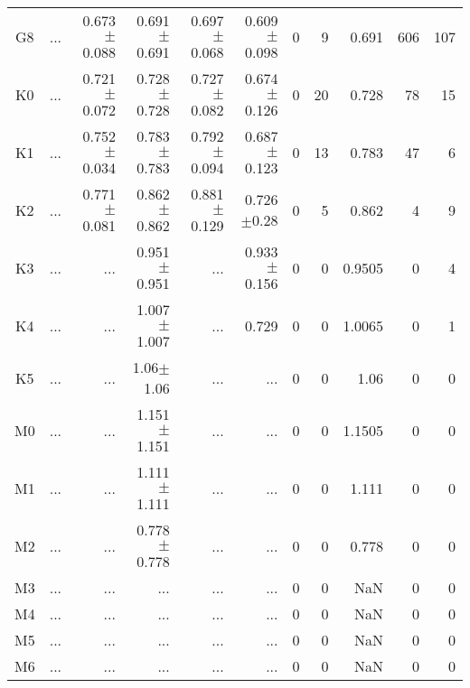 \begin{table}[t]
\begin{center}
\begin{tabular}{c|rrrrr|rrrrr}
G8	&	 ...	&	0.673$\pm$0.088	&	0.691$\pm$0.691	&	0.697$\pm$0.068	&	0.609$\pm$0.098	&	0	&	9	&	0.691	&	606	&	107	\\
K0	&	 ...	&	0.721$\pm$0.072	&	0.728$\pm$0.728	&	0.727$\pm$0.082	&	0.674$\pm$0.126	&	0	&	20	&	0.728	&	78	&	15	\\
K1	&	 ...	&	0.752$\pm$0.034	&	0.783$\pm$0.783	&	0.792$\pm$0.094	&	0.687$\pm$0.123	&	0	&	13	&	0.783	&	47	&	6	\\
K2	&	 ...	&	0.771$\pm$0.081	&	0.862$\pm$0.862	&	0.881$\pm$0.129	&	0.726$\pm$0.28	&	0	&	5	&	0.862	&	4	&	9	\\
K3	&	 ...	&	 ...	&	0.951$\pm$0.951	&	 ...	&	0.933$\pm$0.156	&	0	&	0	&	0.9505	&	0	&	4	\\
K4	&	 ...	&	 ...	&	1.007$\pm$1.007	&	 ...	&	0.729	&	0	&	0	&	1.0065	&	0	&	1	\\
K5	&	 ...	&	 ...	&	1.06$\pm$1.06	&	 ...	&	 ...	&	0	&	0	&	1.06	&	0	&	0	\\
M0	&	 ...	&	 ...	&	1.151$\pm$1.151	&	 ...	&	 ...	&	0	&	0	&	1.1505	&	0	&	0	\\
M1	&	 ...	&	 ...	&	1.111$\pm$1.111	&	 ...	&	 ...	&	0	&	0	&	1.111	&	0	&	0	\\
M2	&	 ...	&	 ...	&	0.778$\pm$0.778	&	 ...	&	 ...	&	0	&	0	&	0.778	&	0	&	0	\\
M3	&	 ...	&	 ...	&	 ...	&	 ...	&	 ...	&	0	&	0	&	NaN	&	0	&	0	\\
M4	&	 ...	&	 ...	&	 ...	&	 ...	&	 ...	&	0	&	0	&	NaN	&	0	&	0	\\
M5	&	 ...	&	 ...	&	 ...	&	 ...	&	 ...	&	0	&	0	&	NaN	&	0	&	0	\\
M6	&	 ...	&	 ...	&	 ...	&	 ...	&	 ...	&	0	&	0	&	NaN	&	0	&	0	\\
    \bottomrule
    \end{tabular}
\end{center}
\end{table}


